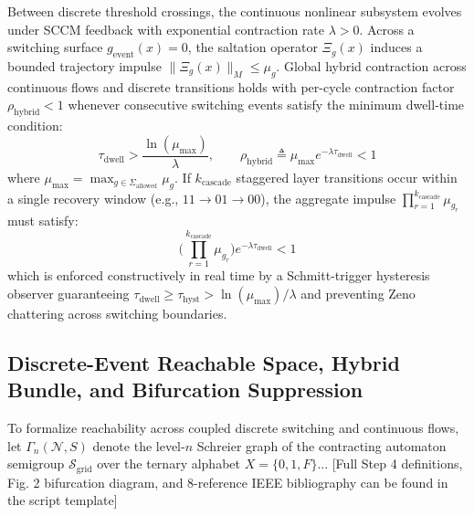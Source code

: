 \documentclass[journal]{IEEEtran}
\begin{document}
Between discrete threshold crossings, the continuous nonlinear subsystem evolves under SCCM feedback with exponential contraction rate $\lambda > 0$. Across a switching surface $g_{\text{event}}(x) = 0$, the saltation operator $\Xi_g(x)$ induces a bounded trajectory impulse $\|\Xi_g(x)\|_{M} \le \mu_g$. Global hybrid contraction across continuous flows and discrete transitions holds with per-cycle contraction factor $\rho_{\text{hybrid}} < 1$ whenever consecutive switching events satisfy the minimum dwell-time condition:
\begin{equation}
\tau_{\text{dwell}} > \frac{\ln(\mu_{\max})}{\lambda}, \qquad \rho_{\text{hybrid}} \triangleq \mu_{\max} e^{-\lambda \tau_{\text{dwell}}} < 1
\end{equation}
where $\mu_{\max} = \max_{g \in \Sigma_{\text{allowed}}} \mu_g$. If $k_{\text{cascade}}$ staggered layer transitions occur within a single recovery window (e.g., $11 \to 01 \to 00$), the aggregate impulse $\prod_{r=1}^{k_{\text{cascade}}} \mu_{g_r}$ must satisfy:
\begin{equation}
\Big(\prod_{r=1}^{k_{\text{cascade}}} \mu_{g_r}\Big) e^{-\lambda \tau_{\text{dwell}}} < 1
\end{equation}
which is enforced constructively in real time by a Schmitt-trigger hysteresis observer guaranteeing $\tau_{\text{dwell}} \ge \tau_{\text{hyst}} > \ln(\mu_{\max})/\lambda$ and preventing Zeno chattering across switching boundaries.
\subsection{Discrete-Event Reachable Space, Hybrid Bundle, and Bifurcation Suppression}
To formalize reachability across coupled discrete switching and continuous flows, let $\Gamma_n(\mathcal{N}, S)$ denote the level-$n$ Schreier graph of the contracting automaton semigroup $\mathcal{S}_{\text{grid}}$ over the ternary alphabet $X = \{0, 1, F\}$...
[Full Step 4 definitions, Fig. 2 bifurcation diagram, and 8-reference IEEE bibliography can be found in the script template]
\end{document}
